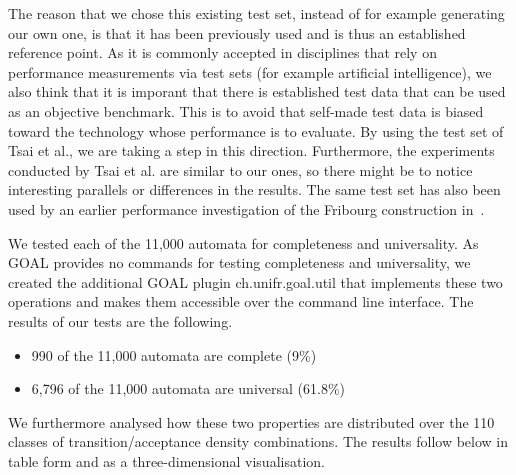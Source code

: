 The reason that we chose this existing test set, instead of for example generating our own one, is that it has been previously used and is thus an established reference point. As it is commonly accepted in disciplines that rely on performance measurements via test sets (for example artificial intelligence), we also think that it is imporant that there is established test data that can be used as an objective benchmark. This is to avoid that self-made test data is biased toward the technology whose performance is to evaluate. By using the test set of Tsai et al., we are taking a step in this direction. Furthermore, the experiments conducted by Tsai et al. are similar to our ones, so there might be to notice interesting parallels or differences in the results. The same test set has also been used by an earlier performance investigation of the Fribourg construction in~\cite{2013_bsc_goettel}.

We tested each of the 11,000 automata for completeness and universality. As GOAL provides no commands for testing completeness and universality, we created the additional GOAL plugin \textsf{ch.unifr.goal.util} that implements these two operations and makes them accessible over the command line interface. The results of our tests are the following.

\begin{itemize}
\item 990 of the 11,000 automata are complete (9\%)
\item 6,796 of the 11,000 automata are universal (61.8\%)
\end{itemize}

We furthermore analysed how these two properties are distributed over the 110 classes of transition/acceptance density combinations. The results follow below in table form and as a three-dimensional visualisation.

